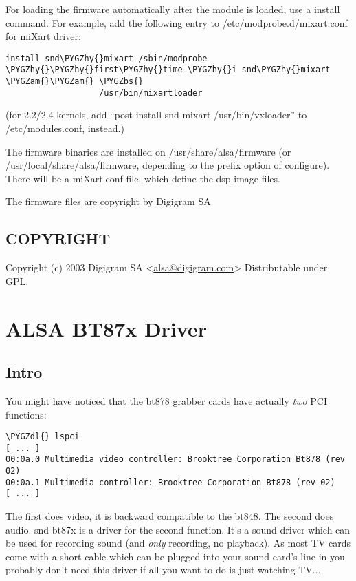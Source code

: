 \documentclass[a4paper,8pt,english]{sphinxmanual}
\def\PYGZbs{\char`\\}
\def\PYGZam{\char`\&}
\def\PYGZdl{\char`\$}
\def\PYGZhy{\char`\-}
\begin{document}
For loading the firmware automatically after the module is loaded, use a
install command.  For example, add the following entry to
/etc/modprobe.d/mixart.conf for miXart driver:

\begin{Verbatim}[commandchars=\\\{\}]
install snd\PYGZhy{}mixart /sbin/modprobe \PYGZhy{}\PYGZhy{}first\PYGZhy{}time \PYGZhy{}i snd\PYGZhy{}mixart \PYGZam{}\PYGZam{} \PYGZbs{}
                   /usr/bin/mixartloader
\end{Verbatim}

(for 2.2/2.4 kernels, add ``post-install snd-mixart /usr/bin/vxloader'' to
/etc/modules.conf, instead.)

The firmware binaries are installed on /usr/share/alsa/firmware
(or /usr/local/share/alsa/firmware, depending to the prefix option of
configure).  There will be a miXart.conf file, which define the dsp image
files.

The firmware files are copyright by Digigram SA


\subsection{COPYRIGHT}
\label{sound/cards/mixart:copyright}
Copyright (c) 2003 Digigram SA \textless{}\href{mailto:alsa@digigram.com}{alsa@digigram.com}\textgreater{}
Distributable under GPL.


\section{ALSA BT87x Driver}
\label{sound/cards/bt87x::doc}\label{sound/cards/bt87x:alsa-bt87x-driver}

\subsection{Intro}
\label{sound/cards/bt87x:intro}
You might have noticed that the bt878 grabber cards have actually
\emph{two} PCI functions:

\begin{Verbatim}[commandchars=\\\{\}]
\PYGZdl{} lspci
[ ... ]
00:0a.0 Multimedia video controller: Brooktree Corporation Bt878 (rev 02)
00:0a.1 Multimedia controller: Brooktree Corporation Bt878 (rev 02)
[ ... ]
\end{Verbatim}

The first does video, it is backward compatible to the bt848.  The second
does audio.  snd-bt87x is a driver for the second function.  It's a sound
driver which can be used for recording sound (and \emph{only} recording, no
playback).  As most TV cards come with a short cable which can be plugged
into your sound card's line-in you probably don't need this driver if all
you want to do is just watching TV...
\end{document}
